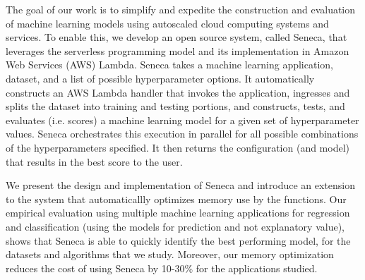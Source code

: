 The goal of our work is to simplify and expedite the 
construction and evaluation of machine learning models 
using autoscaled cloud computing systems and services.
To enable this, we develop an open source system, called Seneca, that leverages
the serverless programming model and its implementation in Amazon Web Services
(AWS) Lambda.  
Seneca takes a machine learning application, dataset, and a list of 
possible hyperparameter options.  It automatically constructs an AWS Lambda
handler that invokes the application, ingresses and splits the dataset into training
and testing portions, and constructs, tests, and evaluates (i.e. scores) a machine
learning model for a given set of hyperparameter values.  Seneca orchestrates
this execution in parallel for all possible combinations of the hyperparameters specified.
It then returns the configuration (and model) that results in the best score 
to the user.  

We present the design and implementation of Seneca and introduce an extension to the
system that automaticallly optimizes memory use by the functions.  
Our empirical evaluation using
multiple machine learning applications for regression and classification (using
the models for prediction and not explanatory value), shows that Seneca is able to quickly
identify the best performing model,
for the datasets and algorithms that we study. 
Moreover, our memory optimization reduces the cost of using
Seneca by 10-30\% for the applications studied.

